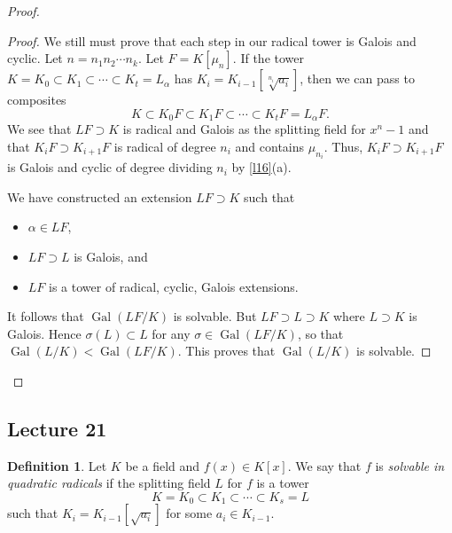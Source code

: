 \documentclass[10pt,letterpaper,cm]{nupset}
\theoremstyle{definition}
\newtheorem{definition}{Definition}[subsection]
\theoremstyle{theorem}
\theoremstyle{remark}
\newcommand{\1}{\mathbf{1}}
\newcommand{\0}{\vec 0}
\DeclareMathOperator{\gal}{Gal}
\begin{document}
\begin{proof}
\begin{proof}
\medskip


We still must prove that each step in our radical tower is Galois and cyclic. Let $n=n_1n_2 \cdots n_k$.  Let $F = K[\mu_n]$. If the tower $K = K_0 \subset K_1 \subset \cdots \subset K_t = L_{\alpha}$ has $K_i = K_{i-1}[\sqrt[n_i]{a_i}]$, then we can pass to composites $$  K \subset K_0F \subset K_1F \subset \cdots \subset K_tF = L_{\alpha}F  .$$ We see that $LF \supset K$ is radical and Galois as the splitting field for $x^n-1$ and that $K_iF \supset K_{i+1}F$ is radical of degree $n_i$ and contains $\mu_{n_i}$. Thus, $K_iF \supset K_{i+1}F$ is Galois and cyclic of degree dividing $n_i$ by \cref{l16}(a). 

\medskip

 We have constructed an extension $LF \supset K$ such that
\begin{itemize}
\item $\alpha \in LF$,
\item $LF \supset L$ is Galois, and
\item $LF$ is a tower of radical, cyclic, Galois extensions.
\end{itemize}
It follows that $\gal(LF/K)$ is solvable. But $LF \supset L \supset K$ where $L \supset K$ is Galois. Hence $\sigma(L) \subset L$ for any $\sigma \in \gal(LF/K)$, so that $\gal(L/K) < \gal(LF/K)$. This proves that $\gal(L/K)$ is solvable.
\end{proof}
\end{proof}

\subsection{Lecture 21}

\begin{definition}
Let $K$ be a field and $f(x) \in K[x]$. We say that $f$ is \textit{solvable in quadratic radicals} if the splitting field $L$ for $f$ is a tower $$K = K_0 \subset K_1 \subset \cdots \subset K_s =L   $$ such that $K_i =K_{i-1}[\sqrt{a_i}]$ for some $a_i \in K_{i-1}$.
\end{definition}
\end{document}

